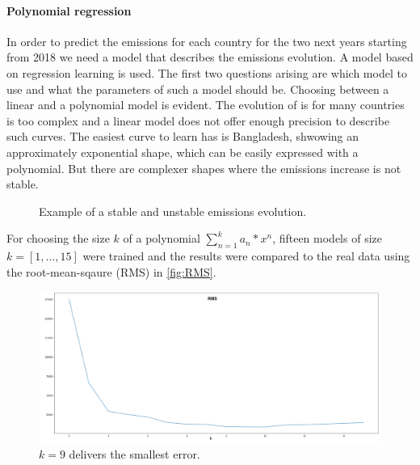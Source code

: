 \paragraph*{Polynomial regression}
In order to predict the emissions for each country for the two next years starting from 2018 we need a model that describes the \co emissions evolution. A model based on regression learning is used. The first two questions arising are  which model to use and what the parameters of such a model should be.
Choosing between a linear and a polynomial model is evident. The evolution of \co is for many countries is too complex and a linear model does not offer enough precision to describe such curves.
The easiest curve to learn has is Bangladesh, shwowing an approximately exponential shape, which can be easily expressed with a polynomial. But there are complexer shapes where the emissions increase is not stable.
\begin{figure}[h!]
	\centering
	\caption{Example of a stable and unstable emissions evolution.}
	\label{fig:Emissions}
\end{figure}
\newline
For choosing the size $k$ of a polynomial $\sum_{n=1}^{k}{a_n*x^n}$, fifteen models of size $k=[1,\dots,15]$ were trained and the results were compared to the real data using the root-mean-sqaure (RMS) in \autoref{fig:RMS}.
\begin{figure}[h!]
	\centering
	\includegraphics[width=0.7\linewidth]{ziedPNGS/RMS}
	\caption{$k=9$ delivers the smallest error.}
	\label{fig:RMS}
\end{figure}

